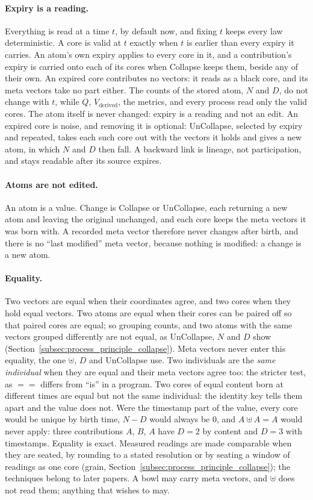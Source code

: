 \documentclass[12pt, a4paper]{article}
\begin{document}
\paragraph{Expiry is a reading.} Everything is read at a time $t$, by
default now, and fixing $t$ keeps every law deterministic. A core is
valid at $t$ exactly when $t$ is earlier than every expiry it carries. An
atom's own expiry applies to every core in it, and a contribution's
expiry is carried onto each of its cores when Collapse keeps them,
beside any of their own. An expired core contributes no vectors: it
reads as a black core, and its meta vectors take no part either. The
counts of the stored atom, $N$ and $D$, do not change with $t$, while
$Q$, $V_{\text{derived}}$, the metrics, and every process read only the
valid cores. The atom itself is never changed: expiry is a reading and not an edit. An expired core is noise, and removing it is optional: UnCollapse, selected by expiry and repeated, takes each such core out with the vectors it holds and gives a new atom, in which $N$ and $D$ then fall. A backward link is lineage, not participation, and stays
readable after its source expires.

\paragraph{Atoms are not edited.} An atom is a value. Change is
Collapse or UnCollapse, each returning a new atom and leaving the
original unchanged, and each core keeps the meta vectors it was born
with. A recorded meta vector therefore never changes after birth, and
there is no ``last modified'' meta vector, because nothing is modified:
a change is a new atom.

\paragraph{Equality.} Two vectors are equal when their coordinates agree, and two cores when they hold equal vectors. Two atoms are equal when their cores can be paired off so that paired cores are equal; so grouping counts, and two atoms with the same vectors grouped differently are not equal, as UnCollapse, $N$ and $D$ show (Section~\ref{subsec:process_principle_collapse}). Meta vectors never enter this equality, the one $\uplus$, $D$ and UnCollapse use. Two individuals are the \emph{same individual} when they are equal and their meta vectors agree too: the stricter test, as $==$ differs from ``is'' in a program. Two cores of equal content born at different times are equal but not the same individual: the identity key tells them apart and the value does not. Were the timestamp part of the value, every core would be unique by birth time, $N-D$ would always be $0$, and $A\uplus A=A$ would never apply: three contributions $A$, $B$, $A$ have $D=2$ by content and $D=3$ with timestamps. Equality is exact. Measured readings are made comparable when they are seated, by rounding to a stated resolution or by seating a window of readings as one core (grain, Section~\ref{subsec:process_principle_collapse}); the techniques belong to later papers. A bowl may carry meta vectors, and $\uplus$ does not read them; anything that wishes to may.
\end{document}
